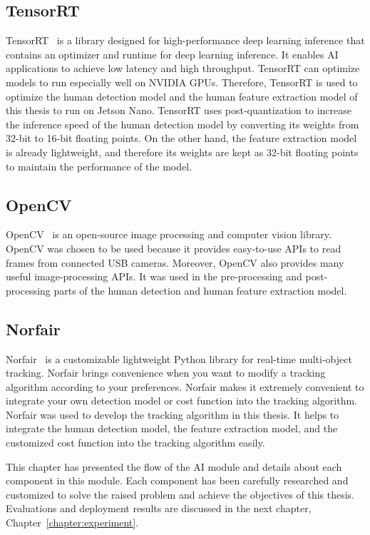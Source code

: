 \documentclass[../main.tex]{subfiles}
\begin{document}
\subsection{TensorRT}
\label{subsec:tensorrt}
TensorRT~\cite{tensorrt} is a library designed for high-performance deep learning inference that contains an optimizer and runtime for deep learning inference. It enables AI applications to achieve low latency and high throughput. TensorRT can optimize models to run especially well on NVIDIA GPUs. Therefore, TensorRT is used to optimize the human detection model and the human feature extraction model of this thesis to run on Jetson Nano. TensorRT uses post-quantization to increase the inference speed of the human detection model by converting its weights from 32-bit to 16-bit floating points. On the other hand, the feature extraction model is already lightweight, and therefore its weights are kept as 32-bit floating points to maintain the performance of the model.

\subsection{OpenCV}
OpenCV~\cite{opencv} is an open-source image processing and computer vision library. OpenCV was chosen to be used because it provides easy-to-use APIs to read frames from connected USB cameras. Moreover, OpenCV also provides many useful image-processing APIs. It was used in the pre-processing and post-processing parts of the human detection and human feature extraction model.

\subsection{Norfair}
Norfair~\cite{norfair} is a customizable lightweight Python library for real-time multi-object tracking. Norfair brings convenience when you want to modify a tracking algorithm according to your preferences. Norfair makes it extremely convenient to integrate your own detection model or cost function into the tracking algorithm. Norfair was used to develop the tracking algorithm in this thesis. It helps to integrate the human detection model, the feature extraction model, and the customized cost function into the tracking algorithm easily.

This chapter has presented the flow of the AI module and details about each component in this module. Each component has been carefully researched and customized to solve the raised problem and achieve the objectives of this thesis. Evaluations and deployment results are discussed in the next chapter, Chapter~\ref{chapter:experiment}.
\end{document}
